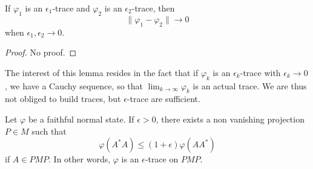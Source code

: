 \begin{corollary}
If $\varphi_1$ is an $\epsilon_1$-trace and $\varphi_2$ is an $\epsilon_2$-trace, then
\[ 
	\| \varphi_1-\varphi_2 \|\to 0
\]
when $\epsilon_1,\epsilon_2\to 0$.
\end{corollary}
\begin{proof}
No proof.
\end{proof}

The interest of this lemma resides in the fact that if $\varphi_k$ is an $\epsilon_k$-trace with $\epsilon_k\to 0$, we have a Cauchy sequence, so that $\lim_{k\to\infty}\varphi_k$ is an actual trace. We are thus not obliged to build traces, but $\epsilon$-trace are sufficient.

\begin{lemma}	\label{LemPMPnormalfaithstate}
Let $\varphi$ be a faithful normal state. If $\epsilon>0$, there exists a non vanishing projection $P\in M$ such that
\[ 
	\varphi(A^*A)\leq(1+\epsilon)\varphi(AA^*)
\]
if $A\in PMP$. In other words, $\varphi$ is an $\epsilon$-trace on $PMP$.
\end{lemma}

